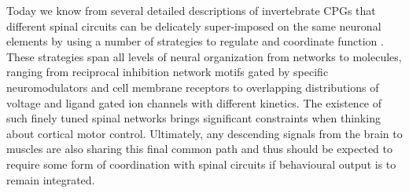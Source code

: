 

Today we know from several detailed descriptions of invertebrate CPGs that different spinal circuits can be delicately super-imposed on the same neuronal elements by using a number of strategies to regulate and coordinate function \cite{Orlovsky1999,Selverston2010}. These strategies span all levels of neural organization from networks to molecules, ranging from reciprocal inhibition network motifs gated by specific neuromodulators and cell membrane receptors to overlapping distributions of voltage and ligand gated ion channels with different kinetics. The existence of such finely tuned spinal networks brings significant constraints when thinking about cortical motor control. Ultimately, any descending signals from the brain to muscles are also sharing this final common path and thus should be expected to require some form of coordination with spinal circuits if behavioural output is to remain integrated.

